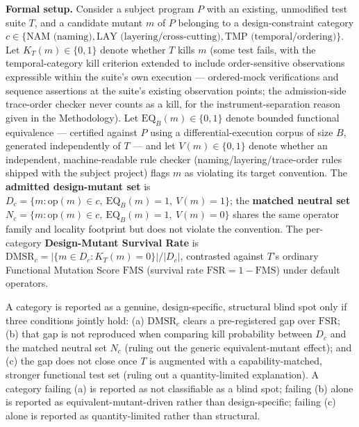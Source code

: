 \documentclass[11pt]{article}
\begin{document}
\noindent\textbf{Formal setup.} Consider a subject program $P$ with an existing, unmodified test suite $T$, and a candidate mutant $m$ of $P$ belonging to a design-constraint category $c \in \{\text{NAM (naming)}, \text{LAY (layering/cross-cutting)}, \text{TMP (temporal/ordering)}\}$. Let $K_T(m) \in \{0,1\}$ denote whether $T$ kills $m$ (some test fails, with the temporal-category kill criterion extended to include order-sensitive observations expressible within the suite's own execution --- ordered-mock verifications and sequence assertions at the suite's existing observation points; the admission-side trace-order checker never counts as a kill, for the instrument-separation reason given in the Methodology). Let $\mathrm{EQ}_B(m) \in \{0,1\}$ denote bounded functional equivalence --- certified against $P$ using a differential-execution corpus of size $B$, generated independently of $T$ --- and let $V(m) \in \{0,1\}$ denote whether an independent, machine-readable rule checker (naming/layering/trace-order rules shipped with the subject project) flags $m$ as violating its target convention. The \textbf{admitted design-mutant set} is $D_c = \{m : \mathrm{op}(m) \in c,\ \mathrm{EQ}_B(m) = 1,\ V(m) = 1\}$; the \textbf{matched neutral set} $N_c = \{m : \mathrm{op}(m) \in c,\ \mathrm{EQ}_B(m) = 1,\ V(m) = 0\}$ shares the same operator family and locality footprint but does not violate the convention. The per-category \textbf{Design-Mutant Survival Rate} is $\mathrm{DMSR}_c = |\{m \in D_c : K_T(m) = 0\}| / |D_c|$, contrasted against $T$'s ordinary Functional Mutation Score $\mathrm{FMS}$ (survival rate $\mathrm{FSR} = 1 - \mathrm{FMS}$) under default operators.

A category is reported as a genuine, design-specific, structural blind spot only if three conditions jointly hold: (a) $\mathrm{DMSR}_c$ clears a pre-registered gap over $\mathrm{FSR}$; (b) that gap is not reproduced when comparing kill probability between $D_c$ and the matched neutral set $N_c$ (ruling out the generic equivalent-mutant effect); and (c) the gap does not close once $T$ is augmented with a capability-matched, stronger functional test set (ruling out a quantity-limited explanation). A category failing (a) is reported as not classifiable as a blind spot; failing (b) alone is reported as equivalent-mutant-driven rather than design-specific; failing (c) alone is reported as quantity-limited rather than structural.
\end{document}
